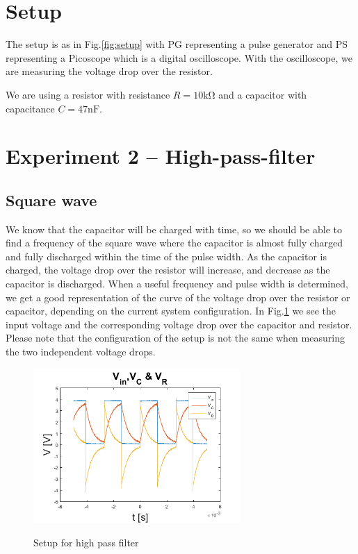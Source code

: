 \documentclass[../main/main.tex]{subfiles}
\begin{document}
\section*{Setup}

The setup is as in Fig.\ref{fig:setup} with PG representing a pulse generator and PS representing a Picoscope which is a digital oscilloscope.
With the oscilloscope, we are measuring the voltage drop over the resistor.

We are using a resistor with resistance \( R = 10 \si{\kilo\ohm} \) and a capacitor with capacitance \( C = 47 \si{\nano\farad} \).

\section*{Experiment 2 -- High-pass-filter}

\subsection*{Square wave}

We know that the capacitor will be charged with time, so we should be able to find a frequency of the square wave where the capacitor is almost fully charged and fully discharged within the time of the pulse width.
As the capacitor is charged, the voltage drop over the resistor will increase, and decrease as the capacitor is discharged.
When a useful frequency and pulse width is determined, we get a good representation of the curve of the voltage drop over the resistor or capacitor, depending on the current system configuration.
In Fig.\ref{fig:VinVCVR} we see the input voltage and the corresponding voltage drop over the capacitor and resistor.
Please note that the configuration of the setup is not the same when measuring the two independent voltage drops.

\begin{figure}[!ht]
  \caption{Setup for high pass filter}
  \centering
    \includegraphics[width=0.7\textwidth]{../img/VinVCVR.png}
    \label{fig:VinVCVR}
\end{figure}
\end{document}
